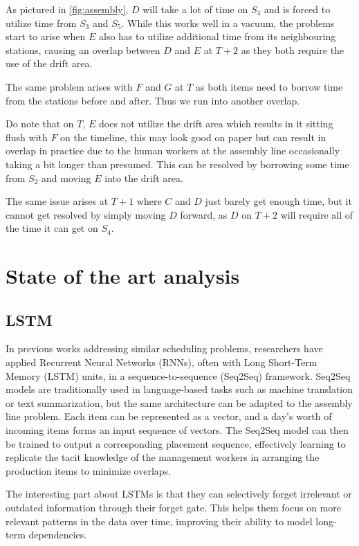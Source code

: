 \documentclass[12pt,a4paper]{report}
\begin{document}
As pictured in \autoref{fig:assembly}, $D$ will take a lot of time on $S_4$ and is forced to utilize time from $S_3$ and $S_5$. 
While this works well in a vacuum, the problems start to arise when $E$ also has to utilize additional time from its neighbouring stations, causing an overlap between $D$ and $E$ at $T+2$ as they both require the use of the drift area. 

The same problem arises with $F$ and $G$ at $T$ as both items need to borrow time from the stations before and after. Thus we run into another overlap.

Do note that on $T$, $E$ does not utilize the drift area which results in it sitting flush with $F$ on the timeline, this may look good on paper but can result in overlap in practice due to the human workers at the assembly line occasionally taking a bit longer than presumed. This can be resolved by borrowing some time from $S_2$ and moving $E$ into the drift area. 

The same issue arises at $T+1$ where $C$ and $D$ just barely get enough time, but it cannot get resolved by simply moving $D$ forward, as $D$ on $T+2$ will require all of the time it can get on $S_4$. 

\chapter{State of the art analysis}
\section{LSTM}

In previous works addressing similar scheduling problems, researchers have applied Recurrent Neural Networks (RNNs), often with Long Short-Term Memory (LSTM) units, in a sequence-to-sequence (Seq2Seq) framework. Seq2Seq models are traditionally used in language-based tasks such as machine translation or text summarization, but the same architecture can be adapted to the assembly line problem.\cite{ref2} Each item can be represented as a vector, and a day’s worth of incoming items forms an input sequence of vectors. The Seq2Seq model can then be trained to output a corresponding placement sequence, effectively learning to replicate the tacit knowledge of the management workers in arranging the production items to minimize overlaps.\cite{ref3} 

The interesting part about LSTMs is that they can selectively forget irrelevant or outdated information through their forget gate. This helps them focus on more relevant patterns in the data over time, improving their ability to model long-term dependencies. \cite{ref4}
\end{document}
